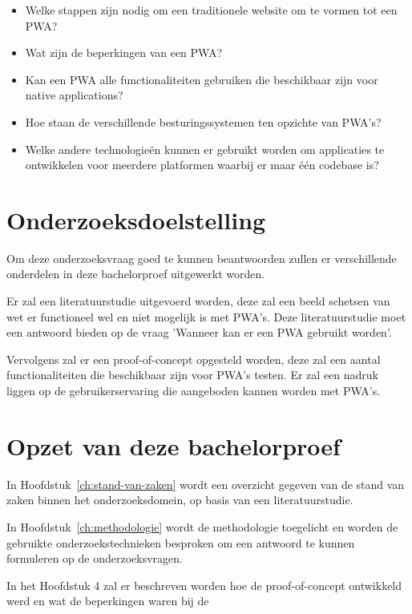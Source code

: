 	\begin{itemize}
		  \item Welke stappen zijn nodig om een traditionele website om te vormen tot een PWA?
		  \item Wat zijn de beperkingen van een PWA?
		  \item Kan een PWA alle functionaliteiten gebruiken die beschikbaar zijn voor native applications?
		  \item Hoe staan de verschillende besturingssystemen ten opzichte van PWA's?
		  \item Welke andere technologieën kunnen er gebruikt worden om applicaties te ontwikkelen voor meerdere platformen waarbij er maar één codebase is?
	  \end{itemize}

\section{Onderzoeksdoelstelling}
	
	Om deze onderzoeksvraag goed te kunnen beantwoorden zullen er verschillende onderdelen in deze bachelorproef uitgewerkt worden.
	
	Er zal een literatuurstudie uitgevoerd worden, deze zal een beeld schetsen van wet er functioneel wel en niet mogelijk is met PWA's. 
	Deze literatuurstudie moet een antwoord bieden op de vraag 'Wanneer kan er een PWA gebruikt worden'.
	
	Vervolgens zal er een proof-of-concept opgesteld worden, deze zal een aantal functionaliteiten die beschikbaar zijn voor PWA's testen. Er zal een nadruk liggen op de gebruikerservaring die aangeboden kannen worden met PWA's.
	
\section{Opzet van deze bachelorproef}

	In Hoofdstuk~\ref{ch:stand-van-zaken} wordt een overzicht gegeven van de stand van zaken binnen het onderzoeksdomein, op basis van een literatuurstudie.
	
	In Hoofdstuk~\ref{ch:methodologie} wordt de methodologie toegelicht en worden de gebruikte onderzoekstechnieken besproken om een antwoord te kunnen formuleren op de onderzoeksvragen.
	
	
	
	In het Hoofdstuk 4 zal er beschreven worden hoe de proof-of-concept ontwikkeld werd en wat de beperkingen waren bij de
	
